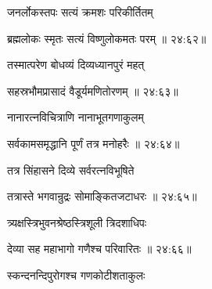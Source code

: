 {\devanagarifont जनर्लोकस्तपः सत्यं क्रमशः परिकीर्तितम् \thinspace{\dandab} \dontdisplaylinenum }%


{\devanagarifont ब्रह्मलोकः स्मृतः सत्यं विष्णुलोकमतः परम् {॥ २४:६२॥} \veg\dontdisplaylinenum }%


{\devanagarifont तस्मात्परेण बोधव्यं दिव्यध्यानपुरं महत् \thinspace{\dandab} \dontdisplaylinenum }%


{\devanagarifont सहस्रभौमप्रासादं वैडूर्यमणितोरणम् {॥ २४:६३॥} \veg\dontdisplaylinenum }%

{\devanagarifont नानारत्नविचित्राणि नानाभूतगणाकुलम् \thinspace{\dandab} \dontdisplaylinenum }%
 

{\devanagarifont सर्वकामसमृद्धानि पूर्णं तत्र मनोहरैः {॥ २४:६४॥} \veg\dontdisplaylinenum }%
 
{\devanagarifont तत्र सिंहासने दिव्ये सर्वरत्नविभूषिते \thinspace{\dandab} \dontdisplaylinenum }%
 

{\devanagarifont तत्रास्ते भगवान्रुद्रः सोमाङ्कितजटाधरः {॥ २४:६५॥} \veg\dontdisplaylinenum }%

{\devanagarifont त्र्यक्षस्त्रिभुवनश्रेष्ठस्त्रिशूली त्रिदशाधिपः \thinspace{\dandab} \dontdisplaylinenum }%


{\devanagarifont देव्या सह महाभागो गणैश्च परिवारितः {॥ २४:६६॥} \veg\dontdisplaylinenum }%
 
{\devanagarifont स्कन्दनन्दिपुरोगश्च गणकोटीशताकुलः \thinspace{\dandab} \dontdisplaylinenum }%


